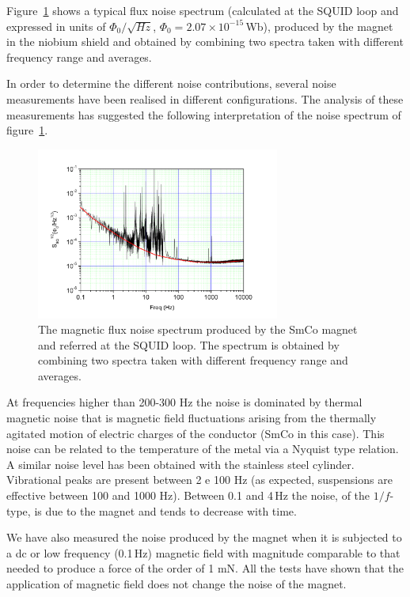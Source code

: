 Figure~\ref{fig:SQUID_spectrum} shows a typical flux noise spectrum (calculated at the SQUID loop and expressed in units of  $\Phi_0 / \sqrt{Hz}$, $\Phi_0= 2.07 \times 10^{-15}$\,Wb), produced by the magnet in the niobium shield and obtained by combining two spectra taken with different frequency range and averages. 

In order to determine the different noise contributions, several noise measurements have been realised in different configurations.
The analysis of these measurements has suggested the following interpretation of the noise spectrum of figure~\ref{fig:SQUID_spectrum}.

\begin{figure}[htbp]
\begin{center}
	\includegraphics[width=80mm]{Sec_Suspensions/Figures/SQUID_spectrum.pdf}
\caption{The magnetic flux noise spectrum produced by the SmCo magnet and referred at the SQUID loop. The spectrum is obtained by combining two spectra taken with different frequency range and averages.}
\label{fig:SQUID_spectrum}
\end{center}
\end{figure}


At frequencies higher than 200-300 Hz the noise is dominated by thermal magnetic noise that is magnetic field fluctuations arising from the thermally agitated motion of electric charges of the conductor (SmCo in this case). This noise can be related to the temperature of the metal via a Nyquist type relation. A similar noise level has been obtained with the stainless steel cylinder.
Vibrational peaks are present between 2 e 100 Hz (as expected, suspensions are effective between 100 and 1000 Hz).
Between 0.1 and 4\,Hz the noise, of the $1/f$-type, is due to the magnet and tends to decrease with time.

We have also measured the noise produced by the magnet when it is subjected to a dc or low frequency (0.1\,Hz) magnetic field with magnitude comparable to that needed to produce a force of the order of 1 mN.  All the tests have shown that the application of magnetic field does not change the noise of the magnet.

